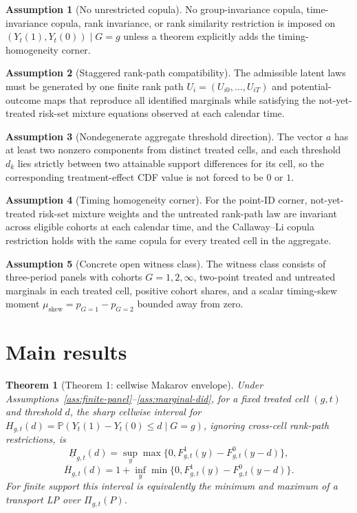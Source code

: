 \documentclass[11pt]{article}
\renewcommand{\Pr}{\mathbb{P}}
\theoremstyle{definition}
\newtheorem{assumption}{Assumption}
\theoremstyle{plain}
\newtheorem{theorem}{Theorem}
\theoremstyle{remark}
\begin{document}
\begin{assumption}[No unrestricted copula]\label{ass:no-copula}
No group-invariance copula, time-invariance copula, rank invariance, or rank similarity restriction is imposed on \((Y_t(1),Y_t(0))\mid G=g\) unless a theorem explicitly adds the timing-homogeneity corner.
\end{assumption}

\begin{assumption}[Staggered rank-path compatibility]\label{ass:rankpath}
The admissible latent laws must be generated by one finite rank path \(U_i=(U_{i0},\ldots,U_{iT})\) and potential-outcome maps that reproduce all identified marginals while satisfying the not-yet-treated risk-set mixture equations observed at each calendar time.
\end{assumption}

\begin{assumption}[Nondegenerate aggregate threshold direction]\label{ass:threshold}
The vector \(a\) has at least two nonzero components from distinct treated cells, and each threshold \(d_k\) lies strictly between two attainable support differences for its cell, so the corresponding treatment-effect CDF value is not forced to be \(0\) or \(1\).
\end{assumption}

\begin{assumption}[Timing homogeneity corner]\label{ass:timing-homogeneity}
For the point-ID corner, not-yet-treated risk-set mixture weights and the untreated rank-path law are invariant across eligible cohorts at each calendar time, and the Callaway--Li copula restriction holds with the same copula for every treated cell in the aggregate.
\end{assumption}

\begin{assumption}[Concrete open witness class]\label{ass:witness-class}
The witness class consists of three-period panels with cohorts \(G=1,2,\infty\), two-point treated and untreated marginals in each treated cell, positive cohort shares, and a scalar timing-skew moment \(\mu_{\mathrm{skew}}=p_{G=1}-p_{G=2}\) bounded away from zero.
\end{assumption}

\section{Main results}
\begin{theorem}[Theorem 1: cellwise Makarov envelope]\label{thm:cell-makarov}
Under Assumptions~\ref{ass:finite-panel}--\ref{ass:marginal-did}, for a fixed treated cell \((g,t)\) and threshold \(d\), the sharp cellwise interval for \(H_{g,t}(d)=\Pr(Y_t(1)-Y_t(0)\le d\mid G=g)\), ignoring cross-cell rank-path restrictions, is
\[
\underline H_{g,t}(d)=\sup_y\max\{0,F^1_{g,t}(y)-F^0_{g,t}(y-d)\},
\]
\[
\overline H_{g,t}(d)=1+\inf_y\min\{0,F^1_{g,t}(y)-F^0_{g,t}(y-d)\}.
\]
For finite support this interval is equivalently the minimum and maximum of a transport LP over \(\Pi_{g,t}(P)\).
\end{theorem}
\end{document}
